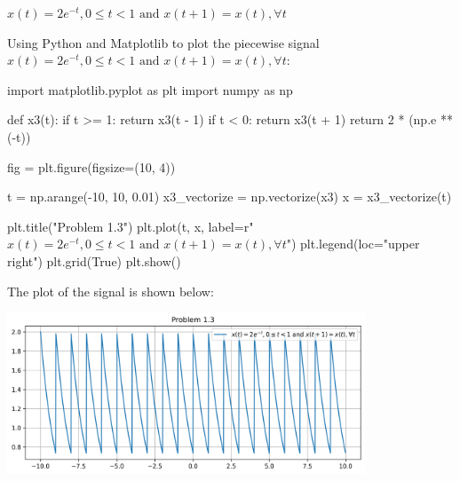 \documentclass[a4paper, 10pt]{article}
\begin{document}

\newpage

\begin{tosubmit}
\begin{subproblems}[start=3]
    \item \( x(t) = 2e^{-t}, 0 \leq t < 1 \text{ and } x(t + 1) = x(t), \forall t \)
\end{subproblems}

\par\noindent\submitsolution
Using Python and Matplotlib to plot the piecewise signal \( x(t) = 2e^{-t}, 0 \leq t < 1 \text{ and } x(t + 1) = x(t), \forall t \):
\begin{codingbox}
import matplotlib.pyplot as plt
import numpy as np

def x3(t):
    if t >= 1:
        return x3(t - 1)
    if t < 0:
        return x3(t + 1)
    return 2 * (np.e ** (-t))

fig = plt.figure(figsize=(10, 4))

t = np.arange(-10, 10, 0.01)
x3_vectorize = np.vectorize(x3)
x = x3_vectorize(t)

plt.title("Problem 1.3")
plt.plot(t, x, label=r"$x(t) = 2e^{-t}, 0 \leq t < 1 \text{ and } x(t + 1) = x(t), \forall t$")
plt.legend(loc="upper right")
plt.grid(True)
plt.show()
\end{codingbox}

The plot of the signal is shown below:
\begin{center}
    \includegraphics[width=0.8\textwidth]{images/problem_1_3.png}
\end{center}
\end{tosubmit}

\newpage
\end{document}
